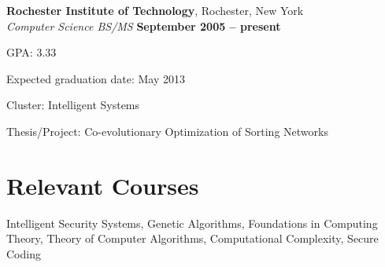 \documentclass[margin,line]{resume}
\begin{document}
\begin{resume}
    \textbf{Rochester Institute of Technology}, Rochester, New York \vspace{1mm}\\\vspace{1mm}%
    \textsl{Computer Science BS/MS} \hfill \textbf{ September 2005 -- present}\vspace{-3mm}\\\vspace{-1mm}%
    \begin{list2}
      \item GPA: 3.33
      \item Expected graduation date: May 2013
      \item Cluster: Intelligent Systems
      \item Thesis/Project: Co-evolutionary Optimization of Sorting Networks 
    \end{list2}\vspace{-1.5mm}

    \section{\mysidestyle Relevant Courses} 
    Intelligent Security Systems, Genetic Algorithms, Foundations in Computing Theory, Theory of Computer Algorithms,
    Computational Complexity, Secure Coding



\end{resume}
\end{document}
